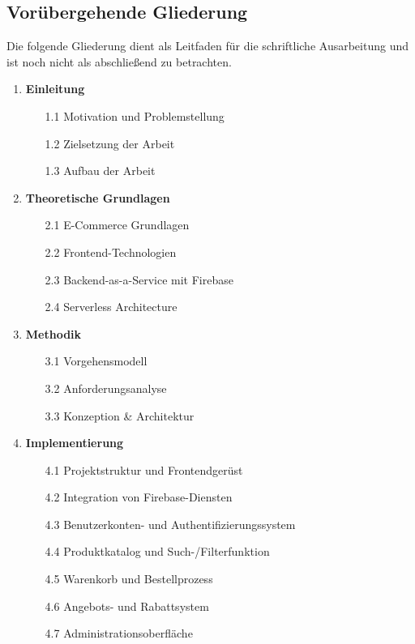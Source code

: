 \documentclass{scrartcl}
\begin{document}
\subsection*{Vorübergehende Gliederung}
Die folgende Gliederung dient als Leitfaden für die schriftliche Ausarbeitung und ist noch nicht als abschließend zu betrachten.

\begin{enumerate}
    \item \textbf{Einleitung}
    \begin{enumerate}
        \setlength{\itemsep}{0pt}
        \setlength{\parskip}{0pt}
        \item[1.1] Motivation und Problemstellung
        \item[1.2] Zielsetzung der Arbeit
        \item[1.3] Aufbau der Arbeit
    \end{enumerate}
    
    \item \textbf{Theoretische Grundlagen}
    \begin{enumerate}
        \setlength{\itemsep}{0pt}
        \setlength{\parskip}{0pt}
        \item[2.1] E-Commerce Grundlagen
        \item[2.2] Frontend-Technologien
        \item[2.3] Backend-as-a-Service mit Firebase
        \item[2.4] Serverless Architecture
    \end{enumerate}
    
    \item \textbf{Methodik}
    \begin{enumerate}
        \setlength{\itemsep}{0pt}
        \setlength{\parskip}{0pt}
        \item[3.1] Vorgehensmodell
        \item[3.2] Anforderungsanalyse
        \item[3.3] Konzeption \& Architektur
    \end{enumerate}
    
    \item \textbf{Implementierung}
    \begin{enumerate}
        \setlength{\itemsep}{0pt}
        \setlength{\parskip}{0pt}
        \item[4.1] Projektstruktur und Frontendgerüst
        \item[4.2] Integration von Firebase-Diensten
        \item[4.3] Benutzerkonten- und Authentifizierungssystem
        \item[4.4] Produktkatalog und Such-/Filterfunktion
        \item[4.5] Warenkorb und Bestellprozess
        \item[4.6] Angebots- und Rabattsystem
        \item[4.7] Administrationsoberfläche
    \end{enumerate}
    

\end{enumerate}
\end{document}
